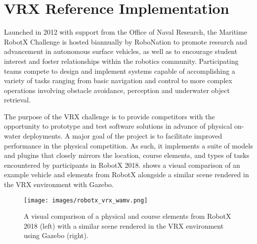 \documentclass[utf8]{frontiersSCNS} %
\begin{document}
\section{VRX Reference Implementation}
Launched in 2012 with support from the Office of Naval Research, the Maritime RobotX Challenge is hosted biannually by RoboNation to promote research and advancement in autonomous surface vehicles, as well as to encourage student interest and foster relationships within the robotics community. Participating teams compete to design and implement systems capable of accomplishing a variety of tasks ranging from basic navigation and control to more complex operations involving obstacle avoidance, perception and underwater object retrieval. %

The purpose of the VRX challenge is to provide competitors with the opportunity to prototype and test software solutions in advance of physical on-water deployments. A major goal of the project is to facilitate improved performance in the physical competition. As such, it implements a suite of models and plugins that closely mirrors the location, course elements, and types of tasks encountered by participants in RobotX 2018.  shows a visual comparison of an example vehicle and elements from RobotX alongside a similar scene rendered in the VRX environment with Gazebo. %

\begin{figure}[hbt!]
  \centering
  \texttt{[image: images/robotx\_vrx\_wamv.png]}
  \caption{A visual comparison of a physical \wamv{} and course elements from RobotX 2018 (left) with a similar scene rendered in the VRX environment using Gazebo (right).}
  \label{f:robotx_vrx}
\end{figure}
\end{document}
